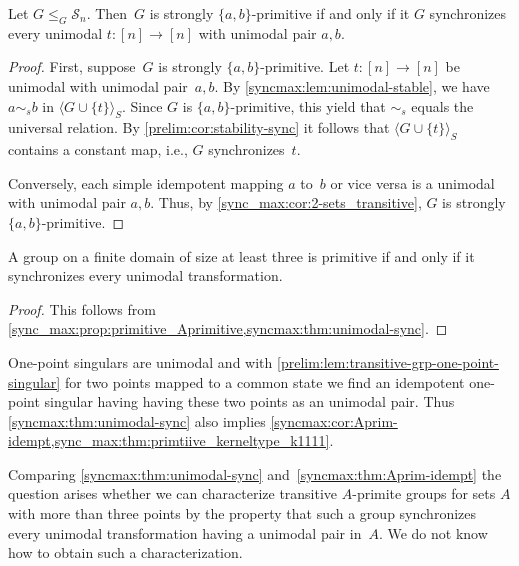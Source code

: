 \begin{theorem} \label{syncmax:thm:unimodal-sync}
	Let $G \le_G \mathcal S_n$.
	Then~$G$ is strongly $\{a,b\}$-primitive
	if and only if it  $G$ synchronizes every unimodal $t \colon [n] \to [n]$ with unimodal pair $a,b$.	
\end{theorem}
\begin{proof}
	First, suppose~$G$ is strongly $\{a,b\}$-primitive.
	Let $t\colon [n] \to [n]$ be unimodal with unimodal pair~$a,b$.
	By \cref{syncmax:lem:unimodal-stable},
	we have $a \sim_s b$ in $\langle G \cup \{t\} \rangle_S$.
	Since $G$ is $\{a,b\}$-primitive, this yield that $\sim_s$
	equals the universal relation. 
	By \cref{prelim:cor:stability-sync} it follows that 
	$\langle G \cup \{t\} \rangle_S$ contains a constant map, i.e., $G$ synchronizes~$t$.
	
	Conversely, each simple idempotent mapping $a$ to~$b$ or vice versa 
	is a unimodal with unimodal pair $a,b$.
	Thus, by \cref{sync_max:cor:2-sets_transitive}, $G$ is strongly $\{a,b\}$-primitive.	
\end{proof}

\begin{corollary} \label{syncmax:cor:unimodal-sync}
	A group on a finite domain of size at least three is primitive
	if and only if it synchronizes every unimodal transformation.	
\end{corollary}
\begin{proof}
	This follows from \cref{sync_max:prop:primitive_Aprimitive,syncmax:thm:unimodal-sync}.
\end{proof}

One-point singulars are unimodal
and with \cref{prelim:lem:transitive-grp-one-point-singular}
for two points mapped to a common state we find
an idempotent one-point singular having 
having these two points as an unimodal pair.
Thus \cref{syncmax:thm:unimodal-sync} also 
implies \cref{syncmax:cor:Aprim-idempt,sync_max:thm:primtiive_kerneltype_k1111}.

\begin{remark}
	Comparing \cref{syncmax:thm:unimodal-sync} and~\cref{syncmax:thm:Aprim-idempt}
	the question arises whether we can characterize
	transitive $A$-primite groups for sets $A$ with more than three points
	by the property that such a group synchronizes every unimodal transformation
	having a unimodal pair in~$A$. We do not know how to obtain such a characterization.	
\end{remark}